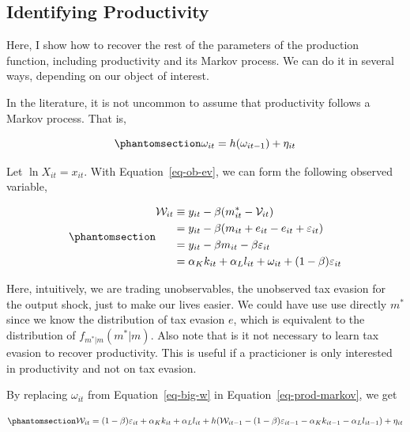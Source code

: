 \documentclass[
  12pt]{article}
\theoremstyle{definition}
\theoremstyle{remark}
\begin{document}
\subsection{Identifying Productivity}\label{identifying-productivity}

Here, I show how to recover the rest of the parameters of the production
function, including productivity and its Markov process. We can do it in
several ways, depending on our object of interest.

In the literature, it is not uncommon to assume that productivity
follows a Markov process. That is,

\begin{equation}\phantomsection\label{eq-prod-markov}{
    \omega_{it}=h(\omega_{it-1})+\eta_{it}
}\end{equation}

Let \(\ln X_{it}=x_{it}\). With Equation~\ref{eq-ob-ev}, we can form the
following observed variable,

\begin{equation}\phantomsection\label{eq-big-w}{
\begin{aligned}
    \mathcal W_{it} & \equiv y_{it} - \beta (m^*_{it}-\mathcal{V}_{it})\\
    & = y_{it} - \beta (m_{it}+e_{it}-e_{it}+\varepsilon_{it})\\
    & = y_{it} - \beta m_{it}-\beta\varepsilon_{it}\\
    & = \alpha_K k_{it}+\alpha_L l_{it}+\omega_{it}+(1-\beta)\varepsilon_{it}
\end{aligned}
}\end{equation}

Here, intuitively, we are trading unobservables, the unobserved tax
evasion for the output shock, just to make our lives easier. We could
have use use directly \(m^*\) since we know the distribution of tax
evasion \(e\), which is equivalent to the distribution of
\(f_{m^*|m}(m^*|m)\). Also note that is it not necessary to learn tax
evasion to recover productivity. This is useful if a practicioner is
only interested in productivity and not on tax evasion.

By replacing \(\omega_{it}\) from Equation~\ref{eq-big-w} in
Equation~\ref{eq-prod-markov}, we get

\begin{equation}\phantomsection\label{eq-big-w-reg}{
\begin{aligned}
    \mathcal W_{it}=(1-\beta)\varepsilon_{it}+\alpha_K k_{it}+\alpha_L l_{it}+h(\mathcal W_{it-1}-(1-\beta)\varepsilon_{it-1}-\alpha_K k_{it-1}-\alpha_L l_{it-1})+\eta_{it}
\end{aligned}
}\end{equation}
\end{document}

